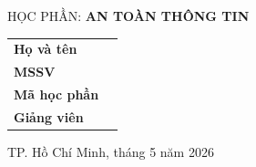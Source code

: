 \begin{titlepage}
\begin{center}
		{\LARGE HỌC PHẦN: \textbf{AN TOÀN THÔNG TIN}}
	\end{center}
	
	\vfill
	
	\begin{center}
		\begin{tabular}{l @{ : } l}
			\large \textbf{Họ và tên} \\
			\large \textbf{MSSV} \\
			\large \textbf{Mã học phần} \\
			\large \textbf{Giảng viên}
		\end{tabular}
		
	\end{center}
	
	\vfill
	
	\begin{center}
		TP. Hồ Chí Minh, tháng 5 năm 2026
	\end{center}
\end{titlepage}